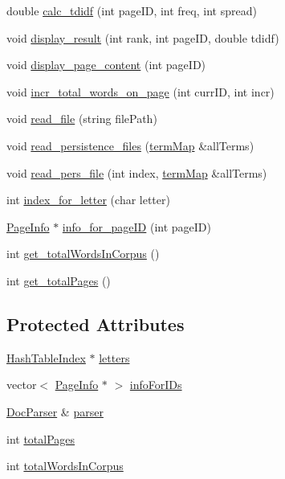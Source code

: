 \begin{DoxyCompactItemize}
\item 
double \hyperlink{class_index_interface_a8195aee88cd593c2e6ca2e2c48cbd068}{calc\+\_\+tdidf} (int page\+I\+D, int freq, int spread)
\item 
void \hyperlink{class_index_interface_a7e4d5fe8c31cfc9aa02c2dd1d7e1d3aa}{display\+\_\+result} (int rank, int page\+I\+D, double tdidf)
\item 
void \hyperlink{class_index_interface_a3d784385e028557312ef15d59574f9ed}{display\+\_\+page\+\_\+content} (int page\+I\+D)
\item 
void \hyperlink{class_index_interface_a5734b1488a787d47984bf97ffa5aff8d}{incr\+\_\+total\+\_\+words\+\_\+on\+\_\+page} (int curr\+I\+D, int incr)
\item 
void \hyperlink{class_index_interface_a229f1eb93f38d85d78e64e579c46c98a}{read\+\_\+file} (string file\+Path)
\item 
void \hyperlink{class_index_interface_aa6ef58f8b651083175b684b9428a90c5}{read\+\_\+persistence\+\_\+files} (\hyperlink{docparser_8h_a9b942645c404d380838be4078b0199d9}{term\+Map} \&all\+Terms)
\item 
void \hyperlink{class_index_interface_adcba07c90cd34ab0ce7bee340d09ed07}{read\+\_\+pers\+\_\+file} (int index, \hyperlink{docparser_8h_a9b942645c404d380838be4078b0199d9}{term\+Map} \&all\+Terms)
\item 
int \hyperlink{class_index_interface_a9a7539d9c7a48bf4d4fbe43961c0547f}{index\+\_\+for\+\_\+letter} (char letter)
\item 
\hyperlink{class_page_info}{Page\+Info} $\ast$ \hyperlink{class_index_interface_a2af7d88c3b2701be9164ba9f4a3bddb3}{info\+\_\+for\+\_\+page\+I\+D} (int page\+I\+D)
\item 
int \hyperlink{class_index_interface_a8a0132ad6e84c4340061496c615f581c}{get\+\_\+total\+Words\+In\+Corpus} ()
\item 
int \hyperlink{class_index_interface_af9edc24ac00bdf2c0e06384f890a1d8a}{get\+\_\+total\+Pages} ()
\end{DoxyCompactItemize}
\subsection*{Protected Attributes}
\begin{DoxyCompactItemize}
\item 
\hyperlink{class_hash_table_index}{Hash\+Table\+Index} $\ast$ \hyperlink{class_index_interface_a8511509bb58da989f705ba75fd5dde2d}{letters}
\item 
vector$<$ \hyperlink{class_page_info}{Page\+Info} $\ast$ $>$ \hyperlink{class_index_interface_a8400a62750faa69ff35308ff731d9ee5}{info\+For\+I\+Ds}
\item 
\hyperlink{class_doc_parser}{Doc\+Parser} \& \hyperlink{class_index_interface_a42b0d9eccd309185ed92976f72908bb9}{parser}
\item 
int \hyperlink{class_index_interface_a2df695d2b504f2e53a0bfdd6bfee31da}{total\+Pages}
\item 
int \hyperlink{class_index_interface_ab607b430e78528cdb8bb79ba4afa91d2}{total\+Words\+In\+Corpus}
\end{DoxyCompactItemize}
